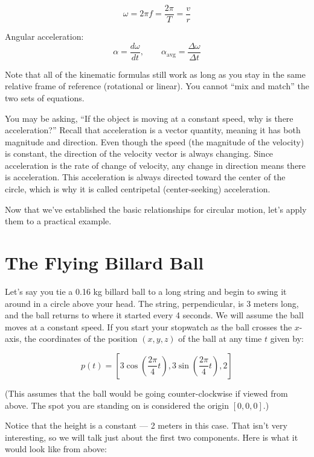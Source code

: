 \[
\omega = 2\pi f = \frac{2\pi}{T} = \frac{v}{r}
\]

Angular acceleration:
\[
\alpha = \frac{d\omega}{dt}, \qquad
\alpha_{\text{avg}} = \frac{\Delta\omega}{\Delta t}
\]

Note that all of the kinematic formulas still work as long as you stay in the same relative frame of reference (rotational or linear). You cannot ``mix and match'' the two sets of equations.

You may be asking, ``If the object is moving at a constant speed, why is there acceleration?'' Recall that acceleration is a vector quantity, meaning it has both magnitude and direction. Even though the speed (the magnitude of the velocity) is constant, the direction of the velocity vector is always changing. Since acceleration is the rate of change of velocity, any change in direction means there is acceleration. This acceleration is always directed toward the center of the circle, which is why it is called centripetal (center-seeking) acceleration. %

Now that we've established the basic relationships for circular motion, let's apply them to a practical example.
\section{The Flying Billard Ball}
Let's say you tie a 0.16 kg billard ball to a long string and begin to swing it around in a circle above your head. The string, perpendicular, is 3 meters long, and the ball returns to where it started every 4 seconds. We will assume the ball moves at a constant speed. If you start your stopwatch as the ball crosses the $x$-axis, the coordinates of the position $(x,y,z)$ of the ball at any time $t$ given by:

$$p(t) = \left[3 \cos{\left( \frac{2 \pi} {4}t\right)}, 3 \sin{ \left( \frac{2 \pi}{4}t\right) }, 2\right]$$

(This assumes that the ball would be going counter-clockwise if viewed
from above. The spot you are standing on is considered the origin $[0, 0, 0]$.)

Notice that the height is a constant --- 2 meters in this
case. That isn't very interesting, so we will talk just about the
first two components.  Here is what it would look like from above:


